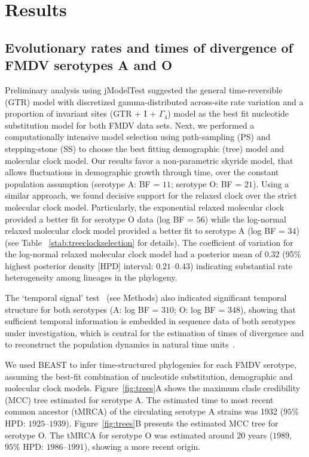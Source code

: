 \documentclass[10pt]{article}
\begin{document}
\section*{Results}

\subsection*{Evolutionary rates and times of divergence of FMDV serotypes A and O}

Preliminary analysis using jModelTest suggested the general time-reversible (GTR) model with discretized gamma-distributed across-site rate variation and a proportion of invariant sites (GTR + I + $\Gamma_{4}$) model as the best fit nucleotide substitution model for both FMDV data sets.
Next, we performed a computationally intensive model selection using path-sampling (PS) and stepping-stone (SS) to choose the best fitting demographic (tree) model and molecular clock model.
Our results favor a non-parametric skyride model, that allows fluctuations in demographic growth through time, over the constant population assumption (serotype A: BF = $11$; serotype O: BF = $21$).
Using a similar approach, we  found decisive support for the relaxed clock over the strict molecular clock model.
Particularly, the exponential relaxed molecular clock provided a better fit for serotype O data (log BF = $56$) while the log-normal relaxed molecular clock model provided a better fit to serotype A (log BF = $34$) (see Table ~\ref{stab:treeclockselection} for details). 
The coefficient of variation for the log-normal relaxed molecular clock model had a posterior mean of $0.32$ (95\% highest posterior density [HPD] interval: $0.21$--$0.43$) indicating substantial rate heterogeneity among lineages in the phylogeny.

The `temporal signal' test~\cite{Faria2012} (see Methods) also indicated significant temporal structure for both serotypes (A: log BF = $310$; O: log BF = $348$), showing that sufficient temporal information is embedded in sequence data of both serotypes under investigation, which is central for the estimation of times of divergence and to reconstruct the population dynamics in natural time units~\cite{MEP}.

We used BEAST to infer time-structured phylogenies for each FMDV serotype, assuming the best-fit combination of nucleotide substitution, demographic and molecular clock models.
Figure~\ref{fig:trees}A shows the maximum clade credibility (MCC) tree estimated for serotype A.
The estimated time to most recent common ancestor (tMRCA) of the circulating serotype A strains was 1932 ($95\%$ HPD: $1925$--$1939$).
Figure~\ref{fig:trees}B presents the estimated MCC tree for serotype O.
The tMRCA for serotype O was estimated around $20$ years ($1989$, $95\%$ HPD: $ 1986$--$1991$), showing a more recent origin. 
\end{document}
